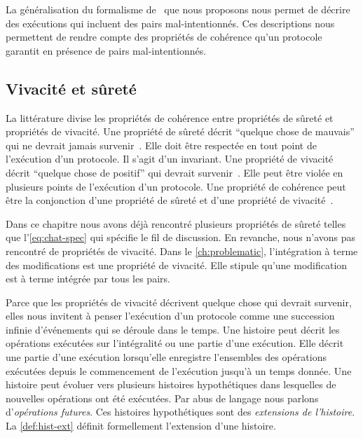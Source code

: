 La généralisation du formalisme de~\textcite{burckhardt_eventualconsistency_2014} que nous proposons nous permet de décrire des exécutions qui incluent des pairs mal-intentionnés.
Ces descriptions nous permettent de rendre compte des propriétés de cohérence qu'un protocole garantit en présence de pairs mal-intentionnés.



\subsection{Vivacité et sûreté}\label{subsec:consistency-spec-liveness-safety}

La littérature divise les propriétés de cohérence entre propriétés de sûreté et propriétés de vivacité.
Une propriété de sûreté décrit \enquote{quelque chose de mauvais} qui ne devrait jamais survenir~\autocite{lamport_1977_correctness}.
Elle doit être respectée en tout point de l'exécution d'un protocole.
Il s'agit d'un invariant.
Une propriété de vivacité décrit \enquote{quelque chose de positif} qui devrait survenir~\autocite{lamport_1977_correctness}.
Elle peut être violée en plusieurs points de l'exécution d'un protocole.
Une propriété de cohérence peut être la conjonction d'une propriété de sûreté et d'une propriété de vivacité~\autocite{alpern_liveness_1985}.

Dans ce chapitre nous avons déjà rencontré plusieurs propriétés de sûreté telles que l'\autoref{eq:chat-spec} qui spécifie le fil de discussion.
En revanche, nous n'avons pas rencontré de propriétés de vivacité.
Dans le \autoref{ch:problematic}, l'intégration à terme des modifications est une propriété de vivacité.
Elle stipule qu'une modification est à terme intégrée par tous les pairs.

Parce que les propriétés de vivacité décrivent quelque chose qui devrait survenir, elles nous invitent à penser l'exécution d'un protocole comme une succession infinie d'événements qui se déroule dans le temps.
Une histoire peut décrit les opérations exécutées sur l'intégralité ou une partie d'une exécution.
Elle décrit une partie d'une exécution lorsqu'elle enregistre l'ensembles des opérations exécutées depuis le commencement de l'exécution jusqu'à un temps donnée.
Une histoire peut évoluer vers plusieurs histoires hypothétiques dans lesquelles de nouvelles opérations ont été exécutées.
Par abus de langage nous parlons d'\emph{opérations futures}.
Ces histoires hypothétiques sont des \emph{extensions de l'histoire}.
La \autoref{def:hist-ext} définit formellement l'extension d'une histoire.

